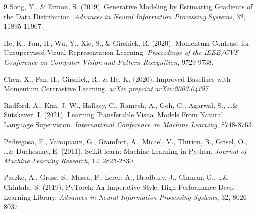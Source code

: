 \begin{thebibliography}{9}
Song, Y., \& Ermon, S. (2019).
Generative Modeling by Estimating Gradients of the Data Distribution.
\textit{Advances in Neural Information Processing Systems}, 32, 11895-11907.

He, K., Fan, H., Wu, Y., Xie, S., \& Girshick, R. (2020).
Momentum Contrast for Unsupervised Visual Representation Learning.
\textit{Proceedings of the IEEE/CVF Conference on Computer Vision and Pattern Recognition}, 9729-9738.

Chen, X., Fan, H., Girshick, R., \& He, K. (2020).
Improved Baselines with Momentum Contrastive Learning.
\textit{arXiv preprint arXiv:2003.04297}.

Radford, A., Kim, J. W., Hallacy, C., Ramesh, A., Goh, G., Agarwal, S., \ldots \& Sutskever, I. (2021).
Learning Transferable Visual Models From Natural Language Supervision.
\textit{International Conference on Machine Learning}, 8748-8763.

Pedregosa, F., Varoquaux, G., Gramfort, A., Michel, V., Thirion, B., Grisel, O., \ldots \& Duchesnay, E. (2011).
Scikit-learn: Machine Learning in Python.
\textit{Journal of Machine Learning Research}, 12, 2825-2830.

Paszke, A., Gross, S., Massa, F., Lerer, A., Bradbury, J., Chanan, G., \ldots \& Chintala, S. (2019).
PyTorch: An Imperative Style, High-Performance Deep Learning Library.
\textit{Advances in Neural Information Processing Systems}, 32, 8026-8037.

\end{thebibliography}
